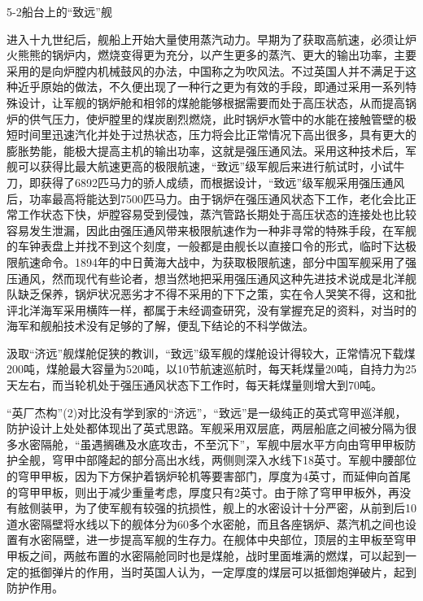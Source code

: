 \documentclass[12pt,UTF8]{ctexbook}
\begin{document}
5-2船台上的“致远”舰

进入十九世纪后，舰船上开始大量使用蒸汽动力。早期为了获取高航速，必须让炉火熊熊的锅炉内，燃烧变得更为充分，以产生更多的蒸汽、更大的输出功率，主要采用的是向炉膛内机械鼓风的办法，中国称之为吹风法。不过英国人并不满足于这种近乎原始的做法，不久便出现了一种行之更为有效的手段，即通过采用一系列特殊设计，让军舰的锅炉舱和相邻的煤舱能够根据需要而处于高压状态，从而提高锅炉的供气压力，使炉膛里的煤炭剧烈燃烧，此时锅炉水管中的水能在接触管壁的极短时间里迅速汽化并处于过热状态，压力将会比正常情况下高出很多，具有更大的膨胀势能，能极大提高主机的输出功率，这就是强压通风法。采用这种技术后，军舰可以获得比最大航速更高的极限航速，“致远”级军舰后来进行航试时，小试牛刀，即获得了6892匹马力的骄人成绩，而根据设计，“致远”级军舰采用强压通风后，功率最高将能达到7500匹马力。由于锅炉在强压通风状态下工作，老化会比正常工作状态下快，炉膛容易受到侵蚀，蒸汽管路长期处于高压状态的连接处也比较容易发生泄漏，因此由强压通风带来极限航速作为一种非寻常的特殊手段，在军舰的车钟表盘上并找不到这个刻度，一般都是由舰长以直接口令的形式，临时下达极限航速命令。1894年的中日黄海大战中，为获取极限航速，部分中国军舰采用了强压通风，然而现代有些论者，想当然地把采用强压通风这种先进技术说成是北洋舰队缺乏保养，锅炉状况恶劣才不得不采用的下下之策，实在令人哭笑不得，这和批评北洋海军采用横阵一样，都属于未经调查研究，没有掌握充足的资料，对当时的海军和舰船技术没有足够的了解，便乱下结论的不科学做法。

汲取“济远”舰煤舱促狭的教训，“致远”级军舰的煤舱设计得较大，正常情况下载煤200吨，煤舱最大容量为520吨，以10节航速巡航时，每天耗煤量20吨，自持力为25天左右，而当轮机处于强压通风状态下工作时，每天耗煤量则增大到70吨。

“英厂杰构”(2)对比没有学到家的“济远”，“致远”是一级纯正的英式穹甲巡洋舰，防护设计上处处都体现出了英式思路。军舰采用双层底，两层船底之间被分隔为很多水密隔舱，“虽遇搁礁及水底攻击，不至沉下”，军舰中层水平方向由穹甲甲板防护全舰，穹甲中部隆起的部分高出水线，两侧则深入水线下18英寸。军舰中腰部位的穹甲甲板，因为下方保护着锅炉轮机等要害部门，厚度为4英寸，而延伸向首尾的穹甲甲板，则出于减少重量考虑，厚度只有2英寸。由于除了穹甲甲板外，再没有舷侧装甲，为了使军舰有较强的抗损性，舰上的水密设计十分严密，从前到后10道水密隔壁将水线以下的舰体分为60多个水密舱，而且各座锅炉、蒸汽机之间也设置有水密隔壁，进一步提高军舰的生存力。在舰体中央部位，顶层的主甲板至穹甲甲板之间，两舷布置的水密隔舱同时也是煤舱，战时里面堆满的燃煤，可以起到一定的抵御弹片的作用，当时英国人认为，一定厚度的煤层可以抵御炮弹破片，起到防护作用。
\end{document}
